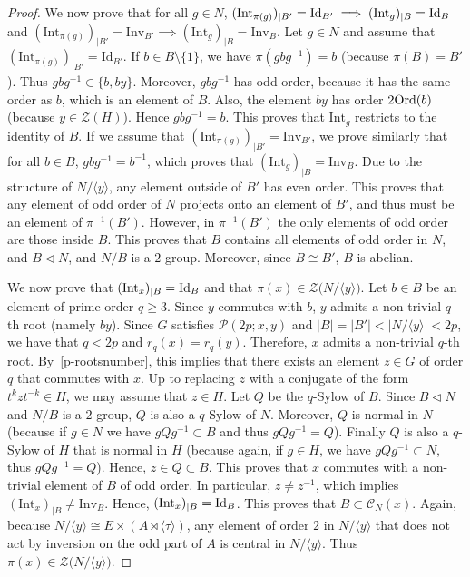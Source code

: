 \documentclass[12pt]{amsart}
\numberwithin{equation}{section}
\newcommand{\Ord}{{\rm Ord}}
\newcommand{\Id}{{\rm Id}}
\theoremstyle{definition}
\theoremstyle{remark}
\begin{document}
\begin{proof}
    We now prove that for all $g\in N$, $(\mathrm{Int}_{\pi(g)})_{|B'}= \mathrm{Id}_{B'}\implies (\mathrm{Int}_{g})_{|B}=\Id_B$ and $(\mathrm{Int}_{\pi(g)})_{|B'}=\mathrm{Inv}_{B'}\implies (\mathrm{Int}_g)_{|B}=\mathrm{Inv}_B$. Let $g\in N$ and assume that $(\mathrm{Int}_{\pi(g)})_{|B'}= \mathrm{Id}_{B'}$. If $b\in B\setminus\{1\} $, we have $\pi(g bg^{-1})=b$ (because $\pi(B)=B'$). Thus $gbg^{-1}\in \{b,by\}$. Moreover, $gbg^{-1}$ has odd order, because it has the same order as $b$, which is an element of $B$. Also, the element $b y$ has order $2\Ord(b)$ (because $y\in \mathcal{Z}(H)$). Hence $gbg^{-1}=b$. This proves that $\mathrm{Int}_g$ restricts to the identity of $B$. If we assume that $(\mathrm{Int}_{\pi(g)})_{|B'}=\mathrm{Inv}_{B'}$, we prove similarly that for all $b\in B$, $gbg^{-1}=b^{-1}$, which proves that $(\mathrm{Int}_g)_{|B}=\mathrm{Inv}_B$. Due to the structure of $N/\langle y\rangle$, any element outside of $B'$ has even order. This proves that any element of odd order of $N$ projects onto an element of $B'$, and thus must be an element of $\pi^{-1}(B')$. However, in $\pi^{-1}(B')$ the only elements of odd order are those inside $B$. This proves that $B$ contains all elements of odd order in $N$, and $B\lhd N$, and $N/B$ is a $2$-group. Moreover, since $B\cong B'$, $B$ is abelian.
    
    We now prove that $(\mathrm{Int}_x)_{|B}=\Id_B$ and that $\pi(x)\in \mathcal{Z}\bigl(N/\langle y\rangle\bigr)$. Let $b\in B$ be an element of prime order $q\ge 3$. Since $y$ commutes with $b$, $y$ admits a non-trivial $q$-th root (namely $by$). Since $G$ satisfies $\mathcal{P}(2p;x,y)$ and $|B|=|B'|<|N/\langle y\rangle |<2p$, we have that $q<2p$ and $r_q(x)=r_q(y)$. Therefore, $x$ admits a non-trivial $q$-th root. By~\eqref{p-rootsnumber}, this implies that there exists an element $z\in G$ of order $q$ that commutes with $x$. Up to replacing $z$ with a conjugate of the form $t^k z t^{-k} \in H$, we may assume that $z\in H$. Let $Q$ be the $q$-Sylow of $B$. Since $B\lhd N$ and $N/B$ is a $2$-group, $Q$ is also a $q$-Sylow of $N$. Moreover, $Q$ is normal in $N$ (because if $g\in N$ we have $gQg^{-1}\subset B$ and thus $gQg^{-1}=Q$). Finally $Q$ is also a $q$-Sylow of $H$ that is normal in $H$ (because again, if $g\in H$, we have $gQg^{-1}\subset N$, thus $gQg^{-1}=Q$). Hence, $z\in Q\subset B$. This proves that $x$ commutes with a non-trivial element of $B$ of odd order. In particular, $z\ne z^{-1}$, which implies $(\mathrm{Int}_x)_{|B}\ne \mathrm{Inv}_B$. Hence, $(\mathrm{Int}_x)_{|B}=\Id_B$. This proves that $B\subset \mathcal{C}_N(x)$. Again, because $N/\langle y\rangle \cong E\times (A\rtimes \langle \tau\rangle)$, any element of order $2$ in $N/\langle y\rangle$ that does not act by inversion on the odd part of $A$ is central in $N/\langle y\rangle$. Thus $\pi(x)\in \mathcal{Z}\bigl(N/\langle y\rangle\bigr)$.  
    

\end{proof}
\end{document}
